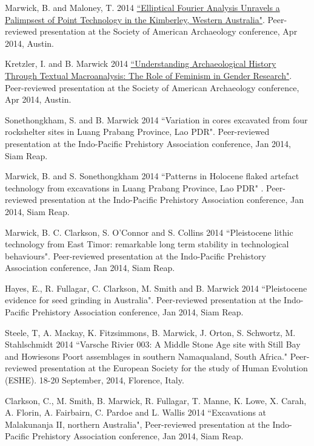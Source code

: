 \ind Marwick, B. and Maloney, T. 2014 {\href{https://github.com/benmarwick/marwick-and-maloney-saa2014}{``Elliptical Fourier Analysis Unravels a Palimpsest of Point Technology  in the Kimberley, Western Australia"}}. Peer-reviewed presentation at the Society of American Archaeology conference, Apr 2014, Austin.

\ind Kretzler, I. and B. Marwick 2014 {\href{https://github.com/benmarwick/kretzler-and-marwick-saa2014}{``Understanding Archaeological History Through Textual Macroanalysis: The Role of Feminism in Gender Research"}}. Peer-reviewed presentation at the Society of American Archaeology conference, Apr 2014, Austin.

\ind Sonethongkham, S. and B. Marwick 2014 ``Variation in cores excavated from four rockshelter sites in Luang Prabang Province, Lao PDR". Peer-reviewed presentation at the Indo-Pacific Prehistory Association conference, Jan 2014, Siam Reap.

\ind Marwick, B.  and S. Sonethongkham 2014 ``Patterns in Holocene flaked artefact technology from excavations in Luang Prabang Province, Lao PDR" . Peer-reviewed presentation at the Indo-Pacific Prehistory Association conference, Jan 2014, Siam Reap.

\ind Marwick, B. C. Clarkson, S. O’Connor and S. Collins 2014 ``Pleistocene lithic technology from East Timor: remarkable long term stability in technological behaviours". Peer-reviewed presentation at the Indo-Pacific Prehistory Association conference, Jan 2014, Siam Reap.

\ind Hayes, E., R. Fullagar, C. Clarkson, M. Smith and B. Marwick 2014 ``Pleistocene evidence for seed grinding in Australia". Peer-reviewed presentation at the Indo-Pacific Prehistory Association conference, Jan 2014, Siam Reap.

\ind Steele, T, A. Mackay, K. Fitzsimmons, B. Marwick, J. Orton, S. Schwortz, M. Stahlschmidt 2014 ``Varsche Rivier 003: A Middle Stone Age site with Still Bay and Howiesons Poort assemblages in southern Namaqualand, South Africa." Peer-reviewed presentation at the European Society for the study of Human Evolution (ESHE). 18-20 September, 2014, Florence, Italy.

\ind Clarkson, C., M. Smith, B. Marwick, R. Fullagar, T. Manne, K. Lowe, X. Carah,  A. Florin, A.  Fairbairn, C. Pardoe and L. Wallis 2014 ``Excavations at Malakunanja II, northern Australia",  Peer-reviewed presentation at the Indo-Pacific Prehistory Association conference, Jan 2014, Siam Reap.


